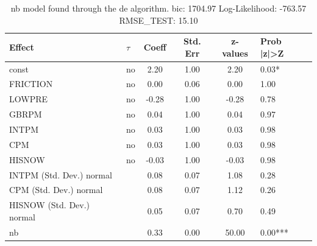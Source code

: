 \begin{table}
	\caption{nb model found through the de algorithm. bic: 1704.97 Log-Likelihood: -763.57 RMSE_TEST: 15.10}
	\begin{center}
		\begin{tabular}{|l|l|c|c|c|l|}
			\hline
			Effect & $\tau$ & Coeff & Std. Err & z-values & Prob |z|>Z \\
			\hline
			const & no & 2.20 & 1.00 & 2.20 & 0.03* \\
			\hline
			FRICTION & no & 0.00 & 0.06 & 0.00 & 1.00 \\
			\hline
			LOWPRE & no & -0.28 & 1.00 & -0.28 & 0.78 \\
			\hline
			GBRPM & no & 0.04 & 1.00 & 0.04 & 0.97 \\
			\hline
			INTPM & no & 0.03 & 1.00 & 0.03 & 0.98 \\
			\hline
			CPM & no & 0.03 & 1.00 & 0.03 & 0.98 \\
			\hline
			HISNOW & no & -0.03 & 1.00 & -0.03 & 0.98 \\
			\hline
			INTPM (Std. Dev.) normal &  & 0.08 & 0.07 & 1.08 & 0.28 \\
			\hline
			CPM (Std. Dev.) normal &  & 0.08 & 0.07 & 1.12 & 0.26 \\
			\hline
			HISNOW (Std. Dev.) normal &  & 0.05 & 0.07 & 0.70 & 0.49 \\
			\hline
			nb &  & 0.33 & 0.00 & 50.00 & 0.00*** \\
			\hline
		\end{tabular}
	\end{center}
\end{table}